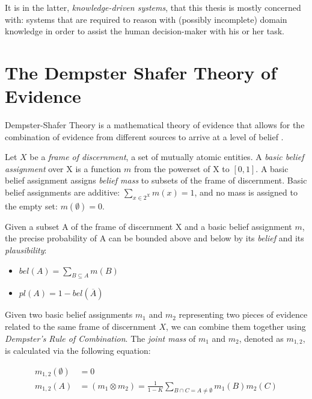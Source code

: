\documentclass[thesis.tex]{subfiles}
\begin{document}
It is in the latter, \emph{knowledge-driven systems}, that this thesis is mostly concerned with: systems
that are required to reason with (possibly incomplete) domain knowledge in order to assist the human
decision-maker with his or her task.



\section{The Dempster Shafer Theory of Evidence}

Dempster-Shafer Theory is a mathematical theory of evidence that allows for the combination of
evidence from different sources to arrive at a level of belief \cite{shafer1976mathematical}.

Let $X$ be a \emph{frame of discernment},
a set of mutually atomic entities. A \emph{basic belief assignment} over X is a function $m$ from the
powerset of X to $[0, 1]$. A basic belief assignment assigns \emph{belief mass} to subsets of the frame
of discernment. Basic belief assignments are additive: $\sum_{x \in 2^X} m(x) = 1$,
and no mass is assigned to the empty set: $m(\emptyset) = 0$.

Given a subset A of the frame of discernment X and a basic belief assignment $m$, the precise probability
of A can be bounded above and below by its \emph{belief} and its \emph{plausibility}:

\begin{itemize}
  \item $bel(A) = \sum_{B \subseteq A} m(B)$
  \item $pl(A) = 1 - bel(\overline{A})$
\end{itemize}

Given two basic belief assignments $m_1$ and $m_2$ representing two pieces of evidence related to the
same frame of discernment $X$, we can combine them together using \emph{Dempster's Rule of Combination}. The
\emph{joint mass} of $m_1$ and $m_2$, denoted as $m_{1,2}$, is calculated via the following equation:

\begin{equation*}
  \begin{split}
    m_{1,2}\left(\emptyset\right) & = 0 \\
    m_{1,2}\left(A\right)         & = \left( m_1 \otimes m_2\right) = \frac{1}{1 - K} \sum_{B \cap C = A \neq \emptyset} m_1(B) m_2(C)
  \end{split}
\end{equation*}
\end{document}
